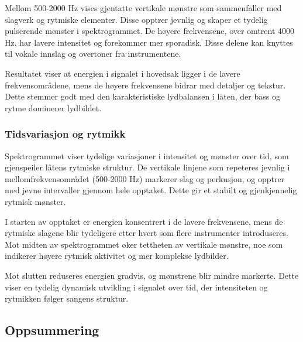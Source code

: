 Mellom 500-2000 Hz vises gjentatte vertikale mønstre som sammenfaller med slagverk og rytmiske elementer. 
Disse opptrer jevnlig og skaper et tydelig pulserende mønster i spektrogrammet.
De høyere frekvensene, over omtrent 4000 Hz, har lavere intensitet og forekommer mer sporadisk. 
Disse delene kan knyttes til vokale innslag og overtoner fra instrumentene.

Resultatet viser at energien i signalet i hovedsak ligger i de lavere frekvensområdene, 
mens de høyere frekvensene bidrar med detaljer og tekstur. Dette stemmer godt med den karakteristiske 
lydbalansen i låten, der bass og rytme dominerer lydbildet.

\subsubsection{Tidsvariasjon og rytmikk}

Spektrogrammet viser tydelige variasjoner i intensitet og mønster over tid, 
som gjenspeiler låtens rytmiske struktur. De vertikale linjene som repeteres 
jevnlig i mellomfrekvensområdet (500-2000 Hz) markerer slag og perkusjon, 
og opptrer med jevne intervaller gjennom hele opptaket. Dette gir et stabilt 
og gjenkjennelig rytmisk mønster.

I starten av opptaket er energien konsentrert i de lavere frekvensene, mens 
de rytmiske slagene blir tydeligere etter hvert som flere instrumenter introduseres. 
Mot midten av spektrogrammet øker tettheten av vertikale mønstre, noe som indikerer 
høyere rytmisk aktivitet og mer komplekse lydbilder.

Mot slutten reduseres energien gradvis, og mønstrene blir mindre markerte. 
Dette viser en tydelig dynamisk utvikling i signalet over tid, der intensiteten 
og rytmikken følger sangens struktur.





\subsection{Oppsummering}
